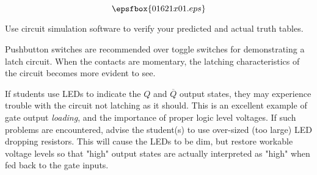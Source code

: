 

$$\epsfbox{01621x01.eps}$$

\vfil \eject






Use circuit simulation software to verify your predicted and actual truth tables.







Pushbutton switches are recommended over toggle switches for demonstrating a latch circuit.  When the contacts are momentary, the latching characteristics of the circuit becomes more evident to see.

If students use LEDs to indicate the $Q$ and $\overline{Q}$ output states, they may experience trouble with the circuit not latching as it should.  This is an excellent example of gate output {\it loading}, and the importance of proper logic level voltages.  If such problems are encountered, advise the student(s) to use over-sized (too large) LED dropping resistors.  This will cause the LEDs to be dim, but restore workable voltage levels so that "high" output states are actually interpreted as "high" when fed back to the gate inputs.




